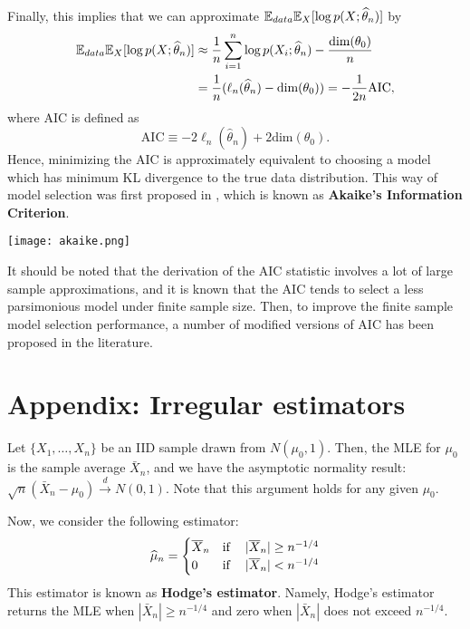 \documentclass[11pt, A4paper, openany, uplatex]{book}
\begin{document}
Finally, this implies that we can approximate $\E_{data} \E_X[\log p(X; \hat \theta_n)]$ by
\begin{align*}
	\E_{data} \E_X[\log p(X; \hat \theta_n)] 
	& \approx \frac{1}{n}\sum_{i = 1}^n \log p(X_i; \hat \theta_n) - \frac{\text{dim}(\theta_0)}{n}\\
	& = \frac{1}{n} ( \ell_n(\hat \theta_n) - \text{dim}(\theta_0) ) = - \frac{1}{2n} \text{AIC}, 
\end{align*}
where $\text{AIC}$ is defined as
\[
	\text{AIC} \equiv - 2\ell_n(\hat \theta_n) + 2 \text{dim}(\theta_0).
\]
Hence, minimizing the AIC is approximately equivalent to choosing a model which has minimum KL divergence to the true data distribution.
This way of model selection was first proposed in \cite{akaike1973information}, which is known as \textbf{Akaike's Information Criterion}.
\begin{center}
	\texttt{[image: akaike.png]}
\end{center}
It should be noted that the derivation of the AIC statistic involves a lot of large sample approximations, and it is known that the AIC tends to select a less parsimonious model under finite sample size.
Then, to improve the finite sample model selection performance, a number of modified versions of AIC has been proposed in the literature.

\section*{Appendix: Irregular estimators}

Let $\{X_1, \ldots, X_n\}$ be an IID sample drawn from $N(\mu_0, 1)$.
Then, the MLE for $\mu_0$ is the sample average $\bar X_n$, and we have the asymptotic normality result: $\sqrt{n}(\bar X_n - \mu_0) \overset{d}{\to} N(0, 1)$. 
Note that this argument holds for any given $\mu_0$.

Now, we consider the following estimator:
\begin{align*}
	\hat \mu_n = \begin{cases}
		\bar X_n & \text{if \;\; $|\bar X_n| \ge n^{-1/4}$}\\
		0        & \text{if \;\; $|\bar X_n| < n^{-1/4}$}
	\end{cases}
\end{align*}
This estimator is known as \textbf{Hodge's estimator}.
Namely, Hodge's estimator returns the MLE when $|\bar X_n| \ge n^{-1/4}$ and zero when $|\bar X_n|$ does not exceed $n^{-1/4}$.
\end{document}
